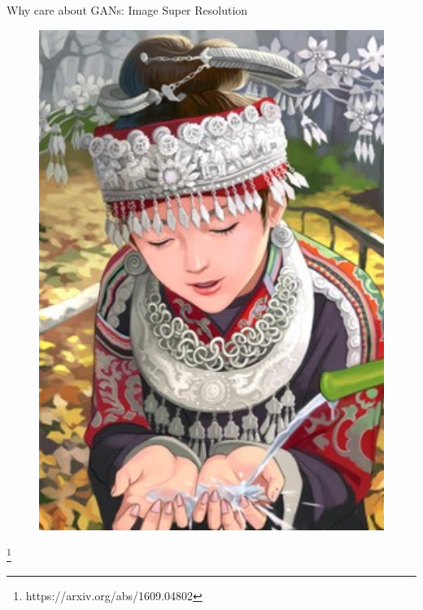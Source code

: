 \documentclass[notheorems]{beamer}
\newcommand{\source}[1]{{\let\thefootnote\relax\footnote{{\tiny #1}}}}
\begin{document}
\begin{frame}{Why care about GANs: Image Super Resolution}
\begin{figure}
\begin{minipage}{.3\textwidth}
                \includegraphics[width=1\textwidth]{figures/super_res/comic_HR}
            \end{minipage}
        \end{figure}

        \source{https://arxiv.org/abs/1609.04802}

    \end{frame}
\end{document}
